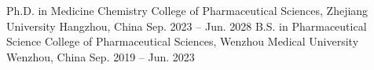 

\begin{cventries}

  \cventry
    {Ph.D. in Medicine Chemistry} %
    {College of Pharmaceutical Sciences, Zhejiang University} %
    {Hangzhou, China} %
    {Sep. 2023 -- Jun. 2028} %
    {}
\vspace{-4mm}
  \cventry
    {B.S. in Pharmaceutical Science} %
    {College of Pharmaceutical Sciences, Wenzhou Medical University} %
    {Wenzhou, China} %
    {Sep. 2019 -- Jun. 2023} %
    {}
\vspace{-8mm}

\end{cventries}

